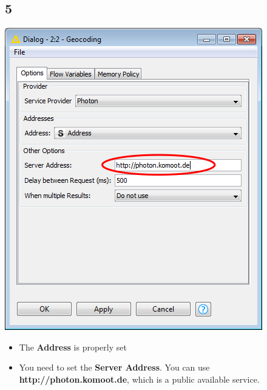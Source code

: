 \documentclass{beamer}
\begin{document}
\subsection{5}
\begin{frame}
	\begin{center}
  		\includegraphics[height=0.6\textheight]{5.png}
	\end{center}
	\begin{itemize}
        \item The \textbf{Address} is properly set
		\item You need to set the \textbf{Server Address}. You can use \textbf{http://photon.komoot.de}, which is a public available service. 
	\end{itemize}
\end{frame}
\end{document}
